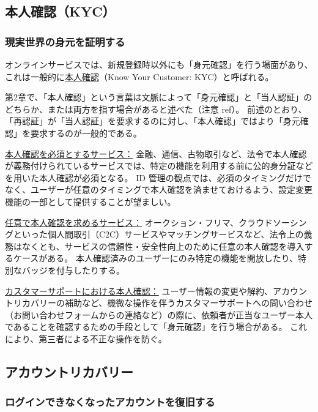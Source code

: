 \documentclass[uplatex]{jsarticle}
\def\ref#1{ref}%
\def\label#1{}%
\begin{document}
\subsection{本人確認（KYC）}

\subsubsection{現実世界の身元を証明する}

\begin{dfn}\label{dfn:kyc}
オンラインサービスでは、新規登録時以外にも「身元確認」を行う場面があり、これは一般的に\underline{本人確認}（Know Your Customer: KYC）と呼ばれる。
\end{dfn}

第2章で、「本人確認」という言葉は文脈によって「身元確認」と「当人認証」のどちらか、または両方を指す場合があると述べた（注意 \ref{rem:honnin-kakunin}）。
前述のとおり、「再認証」が「当人認証」を要求するのに対し、「本人確認」ではより「身元確認」を要求するのが一般的である。

\underline{本人確認を必須とするサービス：}
金融、通信、古物取引など、法令で本人確認が義務付けられているサービスでは、特定の機能を利用する前に公的身分証などを用いた本人確認が必須となる。
ID 管理の観点では、必須のタイミングだけでなく、ユーザーが任意のタイミングで本人確認を済ませておけるよう、設定変更機能の一部として提供することが望ましい。

\underline{任意で本人確認を求めるサービス：}
オークション・フリマ、クラウドソーシングといった個人間取引（C2C）サービスやマッチングサービスなど、法令上の義務はなくとも、サービスの信頼性・安全性向上のために任意の本人確認を導入するケースがある。
本人確認済みのユーザーにのみ特定の機能を開放したり、特別なバッジを付与したりする。

\underline{カスタマーサポートにおける本人確認：}
ユーザー情報の変更や解約、アカウントリカバリーの補助など、機微な操作を伴うカスタマーサポートへの問い合わせ（お問い合わせフォームからの連絡など）の際に、依頼者が正当なユーザー本人であることを確認するための手段として「身元確認」を行う場合がある。
これにより、第三者による不正な操作を防ぐ。

\subsection{アカウントリカバリー}

\subsubsection{ログインできなくなったアカウントを復旧する}
\end{document}
